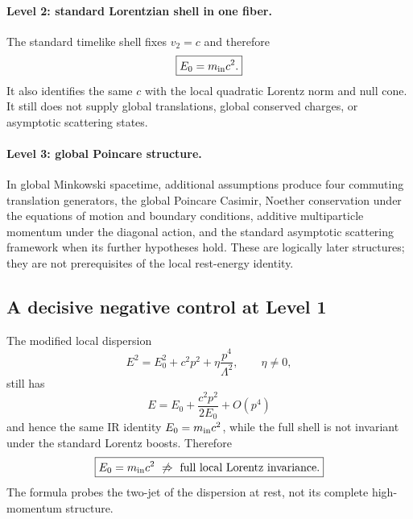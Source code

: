 \documentclass[11pt,a4paper]{article}
\begin{document}
\paragraph{Level 2: standard Lorentzian shell in one fiber.}
The standard timelike shell fixes $v_2=c$ and therefore
\begin{equation}
 \boxed{E_0=m_{\rm in}c^2.}
\end{equation}
It also identifies the same $c$ with the local quadratic Lorentz norm and null cone.  It still does not supply global translations, global conserved charges, or asymptotic scattering states.

\paragraph{Level 3: global Poincare structure.}
In global Minkowski spacetime, additional assumptions produce four commuting translation generators, the global Poincare Casimir, Noether conservation under the equations of motion and boundary conditions, additive multiparticle momentum under the diagonal action, and the standard asymptotic scattering framework when its further hypotheses hold.  These are logically later structures; they are not prerequisites of the local rest-energy identity.

\subsection{A decisive negative control at Level 1}
The modified local dispersion
\begin{equation}
 E^2=E_0^2+c^2p^2+\eta\frac{p^4}{\Lambda^2},\qquad \eta\ne0,
\end{equation}
still has
\begin{equation}
 E=E_0+\frac{c^2p^2}{2E_0}+O(p^4)
\end{equation}
and hence the same IR identity $E_0=m_{\rm in}c^2$, while the full shell is not invariant under the standard Lorentz boosts.  Therefore
\begin{equation}
 \boxed{E_0=m_{\rm in}c^2\ \not\Rightarrow\ \text{full local Lorentz invariance}.}
\end{equation}
The formula probes the two-jet of the dispersion at rest, not its complete high-momentum structure.
\end{document}
